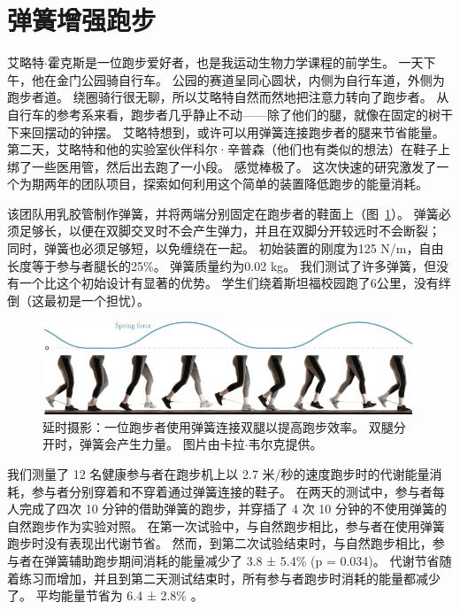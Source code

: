 \section{弹簧增强跑步}

艾略特$\cdot$霍克斯是一位跑步爱好者，也是我运动生物力学课程的前学生。
一天下午，他在金门公园骑自行车。
公园的赛道呈同心圆状，内侧为自行车道，外侧为跑步者道。
绕圈骑行很无聊，所以艾略特自然而然地把注意力转向了跑步者。
从自行车的参考系来看，跑步者几乎静止不动——除了他们的腿，就像在固定的树干下来回摆动的钟摆。
艾略特想到，或许可以用弹簧连接跑步者的腿来节省能量。
第二天，艾略特和他的实验室伙伴科尔·辛普森（他们也有类似的想法）在鞋子上绑了一些医用管，然后出去跑了一小段。
感觉棒极了。
这次快速的研究激发了一个为期两年的团队项目，探索如何利用这个简单的装置降低跑步的能量消耗。


该团队用乳胶管制作弹簧，并将两端分别固定在跑步者的鞋面上（图~\ref{fig:12_15}）。
弹簧必须足够长，以便在双脚交叉时不会产生弹力，并且在双脚分开较远时不会断裂；
同时，弹簧也必须足够短，以免缠绕在一起。
初始装置的刚度为125 N/m，自由长度等于参与者腿长的25\%。
弹簧质量约为0.02 kg。
我们测试了许多弹簧，但没有一个比这个初始设计有显著的优势。
学生们绕着斯坦福校园跑了6公里，没有绊倒（这最初是一个担忧）。


\begin{figure}[!htb]
	\centering
	\includegraphics[width=1.0\linewidth]{chap12/12_15}
	\caption{延时摄影：一位跑步者使用弹簧连接双腿以提高跑步效率。
		双腿分开时，弹簧会产生力量。
		图片由卡拉$\cdot$韦尔克提供。 \label{fig:12_15}}
\end{figure}


我们测量了 12 名健康参与者在跑步机上以 2.7 米/秒的速度跑步时的代谢能量消耗，参与者分别穿着和不穿着通过弹簧连接的鞋子。
在两天的测试中，参与者每人完成了四次 10 分钟的借助弹簧的跑步，并穿插了 4 次 10 分钟的不使用弹簧的自然跑步作为实验对照。
在第一次试验中，与自然跑步相比，参与者在使用弹簧跑步时没有表现出代谢节省。
然而，到第二次试验结束时，与自然跑步相比，参与者在弹簧辅助跑步期间消耗的能量减少了 3.8 ± 5.4\% (p = 0.034)。
代谢节省随着练习而增加，并且到第二天测试结束时，所有参与者跑步时消耗的能量都减少了。
平均能量节省为 6.4 ± 2.8\% \cite{simpson2019connecting}。


